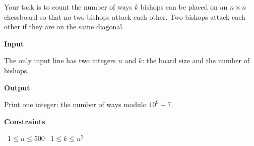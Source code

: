 Your task is to count the number of ways $k$ bishops can be placed on an $n \times n$ chessboard so that no two bishops attack each other.
Two bishops attack each other if they are on the same diagonal.

\vspace{0.3cm}\noindent\textbf{Input}

The only input line has two integers $n$ and $k$: the board size and the number of bishops.

\vspace{0.3cm}\noindent\textbf{Output}

Print one integer: the number of ways modulo $10^9+7$.

\vspace{0.3cm}\noindent\textbf{Constraints}

\textbullet\ $1 \le n \le 500$
\textbullet\ $1 \le k \le n^2$